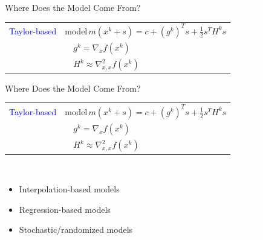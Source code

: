 \documentclass[handout,aspectratio=54]{beamer}
\numberwithin{theorem}{section}
\begin{document}
\begin{frame}{Where Does the Model Come From?}
\colorbox[rgb]{0.5,0.6,0.7}{\textcolor{white}{When derivatives are available:}}

\begin{tabular}{rl}
\textcolor{blue}{Taylor-based} & model\,$m(x^k+s)=c+(g^k)^Ts+\frac{1}{2}s^TH^ks$\\
& $\quad g^k=\nabla_xf(x^k)$\\
& $\quad H^k\approx\nabla_{x,x}^2f(x^k)$
\end{tabular}

\vspace{2.2cm}
\end{frame}

\begin{frame}{Where Does the Model Come From?}
\colorbox[rgb]{0.5,0.6,0.7}{\textcolor{white}{When derivatives are available:}}

\begin{tabular}{rl}
\textcolor{blue}{Taylor-based} & model\,$m(x^k+s)=c+(g^k)^Ts+\frac{1}{2}s^TH^ks$\\
& $\quad g^k=\nabla_xf(x^k)$\\
& $\quad H^k\approx\nabla_{x,x}^2f(x^k)$
\end{tabular}

\colorbox[rgb]{0.5,0.6,0.7}{\textcolor{white}{Without derivatives}}
\begin{itemize}
\item Interpolation-based models
\item Regression-based models
\item Stochastic/randomized models
\end{itemize}
\end{frame}
\end{document}
